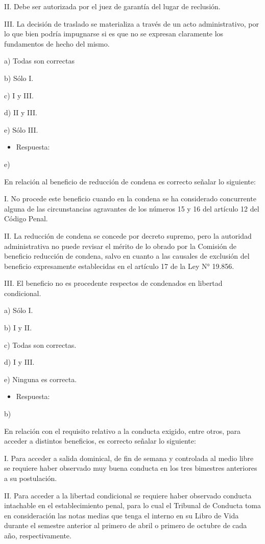 \documentclass[letterpaper, 11pt]{article}
\begin{document}
II. Debe ser autorizada por el juez de garantía del lugar de reclusión.

III. La decisión de traslado se materializa a través de un acto administrativo, por lo que
bien podría impugnarse si es que no se expresan claramente los fundamentos de
hecho del mismo.

a) Todas son correctas

b) Sólo I.

c) I y III.

d) II y III.

e) Sólo III.

\begin{itemize}
\item Respuesta:
\end{itemize}
e)

En relación al beneficio de reducción de condena es correcto señalar lo siguiente:

I. No procede este beneficio cuando en la condena se ha considerado concurrente
alguna de las circunstancias agravantes de los números 15 y 16 del artículo 12 del
Código Penal.

II. La reducción de condena se concede por decreto supremo, pero la autoridad
administrativa no puede revisar el mérito de lo obrado por la Comisión de
beneficio reducción de condena, salvo en cuanto a las causales de exclusión del
beneficio expresamente establecidas en el artículo 17 de la Ley N° 19.856.

III. El beneficio no es procedente respectos de condenados en libertad condicional.

a) Sólo I.

b) I y II.

c) Todas son correctas.

d) I y III.

e) Ninguna es correcta.

\begin{itemize}
\item Respuesta:
\end{itemize}
b)


En relación con el requisito relativo a la conducta exigido, entre otros, para acceder
a distintos beneficios, es correcto señalar lo siguiente:

I. Para acceder a salida dominical, de fin de semana y controlada al medio libre se
requiere haber observado muy buena conducta en los tres bimestres anteriores a
su postulación.

II. Para acceder a la libertad condicional se requiere haber observado conducta
intachable en el establecimiento penal, para lo cual el Tribunal de Conducta toma
en consideración las notas medias que tenga el interno en su Libro de Vida durante
el semestre anterior al primero de abril o primero de octubre de cada año,
respectivamente.
\end{document}
